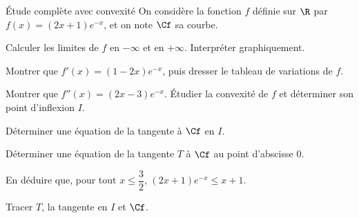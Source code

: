 \begin{exercice}[3]{Étude complète avec convexité}
On considère la fonction $f$ définie sur $\R$ par $f(x)=(2x+1)e^{-x}$, et on note $\Cf$ sa courbe.
\begin{questions}
  \item Calculer les limites de $f$ en $-\infty$ et en $+\infty$. Interpréter graphiquement.
  \item Montrer que $f'(x)=(1-2x)e^{-x}$, puis dresser le tableau de variations de $f$.
\end{questions}
\begin{questions}[resume]
  \item Montrer que $f''(x)=(2x-3)e^{-x}$. Étudier la convexité de $f$ et déterminer son point d'inflexion $I$.
  \item Déterminer une équation de la tangente à $\Cf$ en $I$.
  \item Déterminer une équation de la tangente $T$ à $\Cf$ au point d'abscisse $0$.
  \item En déduire que, pour tout $x\leq\dfrac32$, $(2x+1)e^{-x}\leq x+1$.
  \item Tracer $T$, la tangente en $I$ et $\Cf$.
\end{questions}
\end{exercice}

